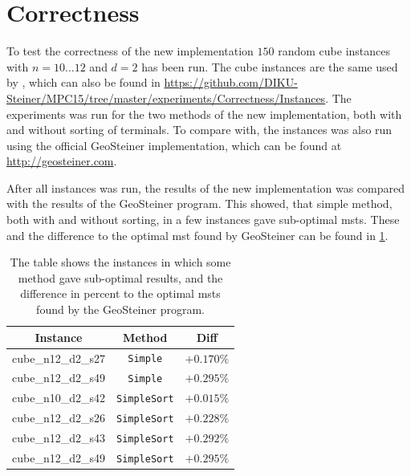 \section{Correctness}
\label{sec:correctness}

To test the correctness of the new implementation $150$ random cube instances
with $n = 10 \ldots 12$ and $d = 2$ has been run. The cube instances are the
same used by \textcite{fonseca2014}, which can also be found in
\url{https://github.com/DIKU-Steiner/MPC15/tree/master/experiments/Correctness/Instances}. The
experiments was run for the two methods of the new implementation, both with and
without sorting of terminals. To compare with, the instances was also run using
the official GeoSteiner implementation, which can be found at
\url{http://geosteiner.com}.

After all instances was run, the results of the new implementation was compared
with the results of the GeoSteiner program. This showed, that simple method,
both with and without sorting, in a few instances gave sub-optimal
\acp{mst}. These and the difference to the optimal \ac{mst} found by GeoSteiner
can be found in \cref{tab:correctness-errors}.

\begin{table}[htbp]
  \centering
  \begin{tabular}{ccc}
    \toprule
    Instance           & Method              & Diff       \\
    \midrule
    cube\_n12\_d2\_s27 & \texttt{Simple}     & $+0.170\%$ \\
    cube\_n12\_d2\_s49 & \texttt{Simple}     & $+0.295\%$ \\
    cube\_n10\_d2\_s42 & \texttt{SimpleSort} & $+0.015\%$ \\
    cube\_n12\_d2\_s26 & \texttt{SimpleSort} & $+0.228\%$ \\
    cube\_n12\_d2\_s43 & \texttt{SimpleSort} & $+0.292\%$ \\
    cube\_n12\_d2\_s49 & \texttt{SimpleSort} & $+0.295\%$ \\
    \bottomrule
  \end{tabular}
  \caption[Suboptimal \acsp{mst} in correctness test]{The table shows the
    instances in which some method gave sub-optimal results, and the difference
    in percent to the optimal \acp{mst} found by the GeoSteiner
    program.\label{tab:correctness-errors}}
\end{table}


